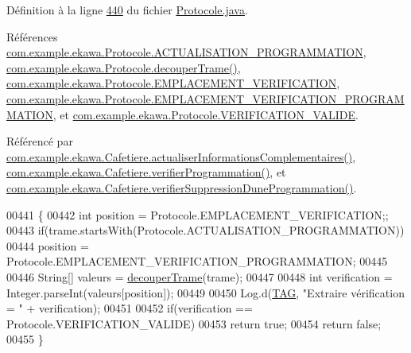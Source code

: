 Définition à la ligne \hyperlink{_protocole_8java_source_l00440}{440} du fichier \hyperlink{_protocole_8java_source}{Protocole.\+java}.



Références \hyperlink{_protocole_8java_source_l00037}{com.\+example.\+ekawa.\+Protocole.\+A\+C\+T\+U\+A\+L\+I\+S\+A\+T\+I\+O\+N\+\_\+\+P\+R\+O\+G\+R\+A\+M\+M\+A\+T\+I\+ON}, \hyperlink{_protocole_8java_source_l00208}{com.\+example.\+ekawa.\+Protocole.\+decouper\+Trame()}, \hyperlink{_protocole_8java_source_l00084}{com.\+example.\+ekawa.\+Protocole.\+E\+M\+P\+L\+A\+C\+E\+M\+E\+N\+T\+\_\+\+V\+E\+R\+I\+F\+I\+C\+A\+T\+I\+ON}, \hyperlink{_protocole_8java_source_l00085}{com.\+example.\+ekawa.\+Protocole.\+E\+M\+P\+L\+A\+C\+E\+M\+E\+N\+T\+\_\+\+V\+E\+R\+I\+F\+I\+C\+A\+T\+I\+O\+N\+\_\+\+P\+R\+O\+G\+R\+A\+M\+M\+A\+T\+I\+ON}, et \hyperlink{_protocole_8java_source_l00087}{com.\+example.\+ekawa.\+Protocole.\+V\+E\+R\+I\+F\+I\+C\+A\+T\+I\+O\+N\+\_\+\+V\+A\+L\+I\+DE}.



Référencé par \hyperlink{_cafetiere_8java_source_l00574}{com.\+example.\+ekawa.\+Cafetiere.\+actualiser\+Informations\+Complementaires()}, \hyperlink{_cafetiere_8java_source_l00606}{com.\+example.\+ekawa.\+Cafetiere.\+verifier\+Programmation()}, et \hyperlink{_cafetiere_8java_source_l00804}{com.\+example.\+ekawa.\+Cafetiere.\+verifier\+Suppression\+Dune\+Programmation()}.


\begin{DoxyCode}
00441     \{
00442         \textcolor{keywordtype}{int} position = Protocole.EMPLACEMENT\_VERIFICATION;;
00443         \textcolor{keywordflow}{if}(trame.startsWith(Protocole.ACTUALISATION\_PROGRAMMATION))
00444             position = Protocole.EMPLACEMENT\_VERIFICATION\_PROGRAMMATION;
00445 
00446         String[] valeurs = \hyperlink{classcom_1_1example_1_1ekawa_1_1_protocole_a23c261e4ab5ad3c2ac60187f04ae40ea}{decouperTrame}(trame);
00447 
00448         \textcolor{keywordtype}{int} verification = Integer.parseInt(valeurs[position]);
00449 
00450         Log.d(\hyperlink{classcom_1_1example_1_1ekawa_1_1_protocole_ae9b68fa0daac528421b887f19413f8f5}{TAG}, \textcolor{stringliteral}{"Extraire vérification = "} + verification);
00451 
00452         \textcolor{keywordflow}{if}(verification == Protocole.VERIFICATION\_VALIDE)
00453             \textcolor{keywordflow}{return} \textcolor{keyword}{true};
00454         \textcolor{keywordflow}{return} \textcolor{keyword}{false};
00455     \}
\end{DoxyCode}
\mbox{\label{classcom_1_1example_1_1ekawa_1_1_protocole_a71e172b9adefa345ebff98663129f833}} 
